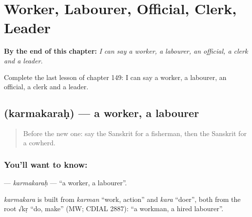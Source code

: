 
\chapter{Worker, Labourer, Official, Clerk, Leader}
\label{ch:sa-worker-labourer-official-clerk-leader}

\begin{chapteropening}
\textbf{By the end of this chapter:} \emph{I can say a worker, a labourer, an official, a clerk and a leader.}

Complete the last lesson of chapter 149: I can say a worker, a labourer, an official, a clerk and a leader.
\end{chapteropening}

\section[\texorpdfstring{\sk{कर्मकरः} (karmakaraḥ)}{कर्मकरः (karmakaraḥ)}]{ (karmakaraḥ) — a worker, a labourer}

\label{lesson:SA-C149-karmakarah}



\begin{quote}
Before the new one: say the Sanskrit for a fisherman, then the Sanskrit for a cowherd.
\end{quote}

\subsection*{You'll want to know: }
\textbf{} — \emph{karmakaraḥ} — \textquotedblleft{}a worker, a labourer\textquotedblright{}.

\begin{cousinweb}
\emph{karmakara} is built from \emph{karman} \textquotedblleft{}work, action\textquotedblright{} and \emph{kara} \textquotedblleft{}doer\textquotedblright{}, both from the root √kṛ \textquotedblleft{}do, make\textquotedblright{} (MW; CDIAL 2887): \textquotedblleft{}a workman, a hired labourer\textquotedblright{}.
\end{cousinweb}

